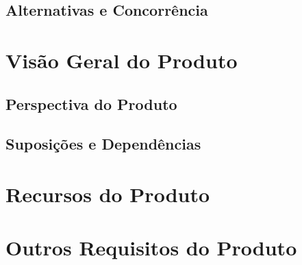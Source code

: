     \subsection{Alternativas e Concorrência}
    \section{Visão Geral do Produto}
    \subsection{Perspectiva do Produto}
    \subsection{Suposições e Dependências}
  \section{Recursos do Produto}
  \section{Outros Requisitos do Produto}
